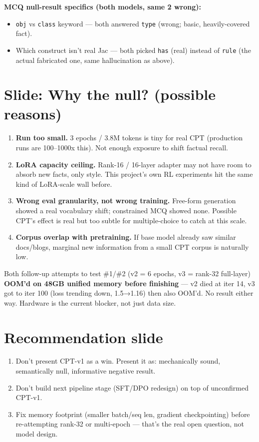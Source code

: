 \documentclass[11pt]{article}
\begin{document}
\textbf{MCQ null-result specifics (both models, same 2 wrong):}
\begin{itemize}[nosep]
  \item \texttt{obj} vs \texttt{class} keyword — both answered \texttt{type} (wrong; basic, heavily-covered fact).
  \item Which construct isn't real Jac — both picked \texttt{has} (real) instead of \texttt{rule} (the actual fabricated one, same hallucination as above).
\end{itemize}

\section{Slide: Why the null? (possible reasons)}
\begin{enumerate}
  \item \textbf{Run too small.} 3 epochs / 3.8M tokens is tiny for real CPT (production runs are 100--1000x this). Not enough exposure to shift factual recall.
  \item \textbf{LoRA capacity ceiling.} Rank-16 / 16-layer adapter may not have room to absorb new facts, only style. This project's own RL experiments hit the same kind of LoRA-scale wall before.
  \item \textbf{Wrong eval granularity, not wrong training.} Free-form generation showed a real vocabulary shift; constrained MCQ showed none. Possible CPT's effect is real but too subtle for multiple-choice to catch at this scale.
  \item \textbf{Corpus overlap with pretraining.} If base model already saw similar docs/blogs, marginal new information from a small CPT corpus is naturally low.
\end{enumerate}
Both follow-up attempts to test \#1/\#2 (v2 = 6 epochs, v3 = rank-32 full-layer) \textbf{OOM'd on 48GB unified memory before finishing} — v2 died at iter 14, v3 got to iter 100 (loss trending down, 1.5→1.16) then also OOM'd. No result either way. Hardware is the current blocker, not just data size.

\section{Recommendation slide}
\begin{enumerate}[nosep]
  \item Don't present CPT-v1 as a win. Present it as: mechanically sound, semantically null, informative negative result.
  \item Don't build next pipeline stage (SFT/DPO redesign) on top of unconfirmed CPT-v1.
  \item Fix memory footprint (smaller batch/seq len, gradient checkpointing) before re-attempting rank-32 or multi-epoch — that's the real open question, not model design.
\end{enumerate}
\end{document}
